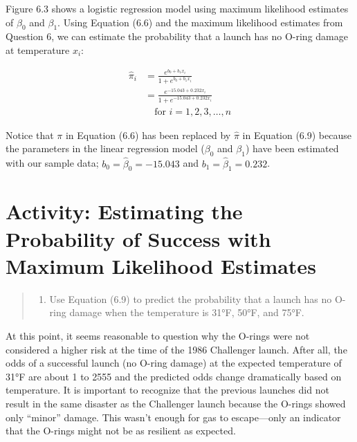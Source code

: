 \documentclass[
]{report}
\providecommand{\tightlist}{%
  \setlength{\itemsep}{0pt}\setlength{\parskip}{0pt}}
\begin{document}
Figure 6.3 shows a logistic regression model using maximum likelihood estimates of \(\beta_0\) and \(\beta_1\). Using Equation (6.6) and the maximum likelihood estimates from Question 6, we can estimate the probability that a launch has no O-ring damage at temperature \(x_i\):

\begin{align}
\hat\pi_i 
&= \frac{e^{b_0 + b_1 x_i}}{1 + e^{b_0 + b_1 x_i}} \\
&= \frac{e^{-15.043 + 0.232 x_i}}{1 + e^{-15.043 + 0.232 x_i}} \\
&\quad \text{for } i = 1,2,3,\dots,n \tag{6.9}
\end{align}

Notice that \(\pi\) in Equation (6.6) has been replaced by \(\hat\pi\) in Equation (6.9) because the parameters in the linear regression model (\(\beta_0\) and \(\beta_1\)) have been estimated with our sample data; \(b_0 = \hat\beta_0 = -15.043\) and \(b_1 = \hat\beta_1 = 0.232\).

\hypertarget{activity-estimating-the-probability-of-success-with-maximum-likelihood-estimates}{%
\section*{Activity: Estimating the Probability of Success with Maximum Likelihood Estimates}\label{activity-estimating-the-probability-of-success-with-maximum-likelihood-estimates}}

\begin{quote}
\begin{enumerate}
\def\labelenumi{\arabic{enumi}.}
\setcounter{enumi}{6}
\tightlist
\item
  Use Equation (6.9) to predict the probability that a launch has no O-ring damage when the temperature is 31°F, 50°F, and 75°F.
\end{enumerate}
\end{quote}

At this point, it seems reasonable to question why the O-rings were not considered a higher risk at the time of the 1986 Challenger launch. After all, the odds of a successful launch (no O-ring damage) at the expected temperature of 31°F are about 1 to 2555 and the predicted odds change dramatically based on temperature. It is important to recognize that the previous launches did not result in the same disaster as the Challenger launch because the O-rings showed only ``minor'' damage. This wasn't enough for gas to escape---only an indicator that the O-rings might not be as resilient as expected.
\end{document}
